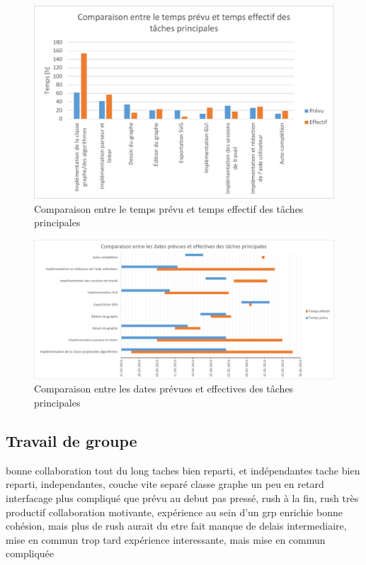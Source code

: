 \documentclass[french]{article}
\begin{document}
			\begin{figure}[H]
				\includegraphics[width=\textwidth]{Planification/comparaisonheures.pdf}
				\caption{Comparaison entre le temps prévu et temps effectif des tâches
					principales}
				\label{fig:comparaisonheures}
			\end{figure}
			
			\begin{figure}[H]
				\includegraphics[width=\textwidth]{Planification/comparaisondates.pdf}
				\caption{Comparaison entre les dates prévues et effectives des tâches principales}
				\label{fig:comparaisondates}
			\end{figure}
		
		\subsection{Travail de groupe}
			bonne collaboration tout du long
			taches bien reparti, et indépendantes
			tache bien reparti, independantes, couche vite separé
			classe graphe un peu en retard
			interfacage plus compliqué que prévu
			au debut pas pressé, rush à la fin, rush très productif
			collaboration motivante, expérience au sein d'un grp enrichie
			bonne cohésion, mais plus de rush aurait du etre fait
			manque de delais intermediaire, mise en commun trop tard
			expérience interessante, mais mise en commun compliquée
			
\end{document}
